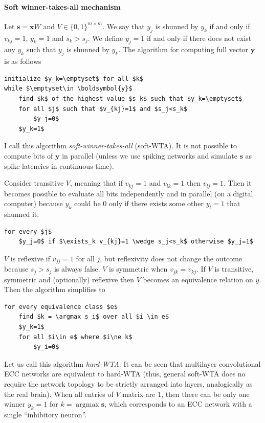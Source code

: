 \documentclass[12pt]{article}
\DeclareMathOperator*{\argmax}{argmax}
\begin{document}
\paragraph{Soft winner-takes-all mechanism} 
Let $\boldsymbol{s}=\boldsymbol{x} W$ and $V\in \{0,1\}^{m\times m}$. 
 We say that $y_j$ is shunned by $y_k$ if and only if  $v_{kj}=1$, $y_k=1$ and $s_k>s_j$. We define $y_j=1$ if and only if there does not exist any $y_k$ such that  $y_j$ is shunned by $y_k$. The algorithm for computing full vector $\boldsymbol{y}$ is as follows
\begin{lstlisting}
initialize $y_k=\emptyset$ for all $k$
while $\emptyset\in \boldsymbol{y}$
    find $k$ of the highest value $s_k$ such that $y_k=\emptyset$
    for all $j$ such that $v_{kj}=1$ and $s_j<s_k$
        $y_j=0$ 
    $y_k=1$
\end{lstlisting}
I call this algorithm \textit{soft-winner-takes-all} (soft-WTA).
It is not possible to compute bits of $\boldsymbol{y}$ in parallel (unless we use spiking networks and simulate $\boldsymbol{s}$ as spike latencies in continuous time). 

 Consider transitive $V$, meaning that if $v_{kj}=1$ and $v_{lk}=1$ then $v_{lj}=1$. Then it becomes possible to evaluate all bits independently and in parallel (on a digital computer) because  $y_{k}$ could be $0$ only if there exists some other $y_l=1$ that shunned it.
\begin{lstlisting}
for every $j$
    $y_j=0$ if $\exists_k v_{kj}=1 \wedge s_j<s_k$ otherwise $y_j=1$
\end{lstlisting}
$V$ is reflexive if $v_{jj}=1$ for all $j$, but reflexivity does not change the outcome because $s_j > s_j$ is always false. $V$ is  symmetric when  $v_{jk}=v_{kj}$. If $V$ is transitive, symmetric and (optionally) reflexive then $V$ becomes an equivalence relation on $y$. Then the algorithm simplifies to
\begin{lstlisting}
for every equivalence class $e$
    find $k = \argmax s_i$ over all $i \in e$
    $y_k=1$ 
    for all $i\in e$ where $i\ne k$
        $y_i=0$ 
\end{lstlisting}
Let us call this algorithm \textit{hard-WTA}.
It can be seen that multilayer convolutional ECC networks are equivalent to hard-WTA (thus, general soft-WTA does no require the network topology to be strictly arranged into layers, analogically as the real brain).
When all entries of $V$ matrix are $1$, then there can be only one winner $y_k=1$ for $k=\argmax \boldsymbol{s}$, which corresponds to an ECC network with a single ``inhibitory neuron''. 
\end{document}
